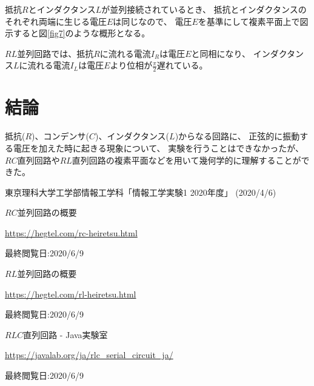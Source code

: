\documentclass[12pt]{jarticle}
\begin{document}
抵抗$R$とインダクタンス$L$が並列接続されているとき、
抵抗とインダクタンスのそれぞれ両端に生じる電圧$E$は同じなので、
電圧$E$を基準にして複素平面上で図示すると図\ref{fig7}のような概形となる。

$RL$並列回路では、抵抗$R$に流れる電流$I_R$は電圧$E$と同相になり、
インダクタンス$L$に流れる電流$I_L$は電圧$E$より位相が$\frac{\pi}{2}$遅れている。

\clearpage

\section{結論}
抵抗($R$)、コンデンサ($C$)、インダクタンス($L$)からなる回路に、
正弦的に振動する電圧を加えた時に起きる現象について、
実験を行うことはできなかったが、
$RC$直列回路や$RL$直列回路の複素平面などを用いて幾何学的に理解することができた。

\begin{thebibliography}{99}
    \label{sannkoubunnkenn_chapter}
    東京理科大学工学部情報工学科「情報工学実験1 2020年度」
    (2020/4/6)

    $RC$並列回路の概要

    \url{https://hegtel.com/rc-heiretsu.html}

    最終閲覧日:2020/6/9

    $RL$並列回路の概要

    \url{https://hegtel.com/rl-heiretsu.html}

    最終閲覧日:2020/6/9

    $RLC$直列回路 - Java実験室

    \url{https://javalab.org/ja/rlc_serial_circuit_ja/}

    最終閲覧日:2020/6/9

\end{thebibliography}

\clearpage
\appendix
\end{document}
